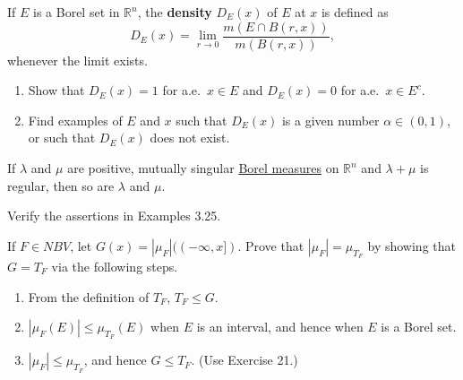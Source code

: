 	\begin{exercise}[Folland 3.25]
		If $E$ is a Borel set in $\mathbb{R}^n$, the \textbf{density} $D_E(x)$ of $E$ at $x$ is defined as
		\begin{equation}
			D_E(x) = \lim_{r \to 0} \frac{m(E \cap B(r, x))}{m(B(r, x))},
		\end{equation}
		whenever the limit exists.
		\begin{enumerate}[label=\textbf{\alph*.}]
			\item Show that $D_E(x) = 1$ for a.e.\ $x \in E$ and $D_E(x) = 0$ for a.e.\ $x \in E^c$.
			\item Find examples of $E$ and $x$ such that $D_E(x)$ is a given number $\alpha \in (0, 1)$, or such that $D_E(x)$ does not exist.
		\end{enumerate}
	\end{exercise}
	\begin{solution}

	\end{solution}

	\begin{exercise}[Folland 3.26]
		If $\lambda$ and $\mu$ are positive, mutually singular \hyperref[def:borel-measure]{Borel measures} on $\mathbb{R}^n$ and $\lambda + \mu$ is regular, then so are $\lambda$ and $\mu$.
	\end{exercise}
	\begin{solution}

	\end{solution}

	\begin{exercise}[Folland 3.27]
		Verify the assertions in Examples 3.25.
	\end{exercise}
	\begin{solution}

	\end{solution}

	\begin{exercise}[Folland 3.28]
		If $F \in NBV$, let $G(x) = |\mu_F|((-\infty, x])$. Prove that $|\mu_F| = \mu_{T_F}$ by showing that $G = T_F$ via the following steps.
		\begin{enumerate}[label=\textbf{\alph*.}]
			\item From the definition of $T_F$, $T_F \le G$.
			\item $|\mu_F(E)| \le \mu_{T_F}(E)$ when $E$ is an interval, and hence when $E$ is a Borel set.
			\item $|\mu_F| \le \mu_{T_F}$, and hence $G \le T_F$. (Use Exercise 21.)
		\end{enumerate}
	\end{exercise}
	\begin{solution}

	\end{solution}

